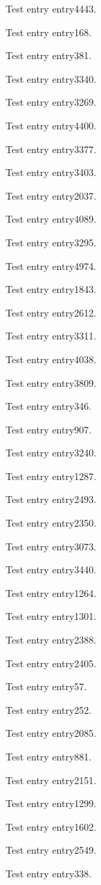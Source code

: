 Test entry \gls{entry4443}.

Test entry \gls{entry168}.

Test entry \gls{entry381}.

Test entry \gls{entry3340}.

Test entry \gls{entry3269}.

Test entry \gls{entry4400}.

Test entry \gls{entry3377}.

Test entry \gls{entry3403}.

Test entry \gls{entry2037}.

Test entry \gls{entry4089}.

Test entry \gls{entry3295}.

Test entry \gls{entry4974}.

Test entry \gls{entry1843}.

Test entry \gls{entry2612}.

Test entry \gls{entry3311}.

Test entry \gls{entry4038}.

Test entry \gls{entry3809}.

Test entry \gls{entry346}.

Test entry \gls{entry907}.

Test entry \gls{entry3240}.

Test entry \gls{entry1287}.

Test entry \gls{entry2493}.

Test entry \gls{entry2350}.

Test entry \gls{entry3073}.

Test entry \gls{entry3440}.

Test entry \gls{entry1264}.

Test entry \gls{entry1301}.

Test entry \gls{entry2388}.

Test entry \gls{entry2405}.

Test entry \gls{entry57}.

Test entry \gls{entry252}.

Test entry \gls{entry2085}.

Test entry \gls{entry881}.

Test entry \gls{entry2151}.

Test entry \gls{entry1299}.

Test entry \gls{entry1602}.

Test entry \gls{entry2549}.

Test entry \gls{entry338}.

